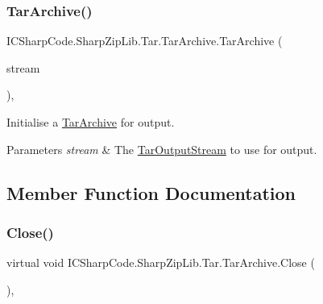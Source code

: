 \subsubsection{\texorpdfstring{Tar\+Archive()}{TarArchive()}\hspace{0.1cm}{\footnotesize\ttfamily [3/3]}}
{\footnotesize\ttfamily I\+C\+Sharp\+Code.\+Sharp\+Zip\+Lib.\+Tar.\+Tar\+Archive.\+Tar\+Archive (\begin{DoxyParamCaption}\item[{\hyperlink{class_i_c_sharp_code_1_1_sharp_zip_lib_1_1_tar_1_1_tar_output_stream}{Tar\+Output\+Stream}}]{stream }\end{DoxyParamCaption})\hspace{0.3cm}{\ttfamily [inline]}, {\ttfamily [protected]}}



Initialise a \hyperlink{class_i_c_sharp_code_1_1_sharp_zip_lib_1_1_tar_1_1_tar_archive}{Tar\+Archive} for output. 


\begin{DoxyParams}{Parameters}
{\em stream} & The \hyperlink{class_i_c_sharp_code_1_1_sharp_zip_lib_1_1_tar_1_1_tar_output_stream}{Tar\+Output\+Stream} to use for output.\\
\hline
\end{DoxyParams}


\subsection{Member Function Documentation}
\mbox{\label{class_i_c_sharp_code_1_1_sharp_zip_lib_1_1_tar_1_1_tar_archive_adadd00e0b2726d82c8997c2b8d71c14b}} 
\subsubsection{\texorpdfstring{Close()}{Close()}}
{\footnotesize\ttfamily virtual void I\+C\+Sharp\+Code.\+Sharp\+Zip\+Lib.\+Tar.\+Tar\+Archive.\+Close (\begin{DoxyParamCaption}{ }\end{DoxyParamCaption})\hspace{0.3cm}{\ttfamily [inline]}, {\ttfamily [virtual]}}



